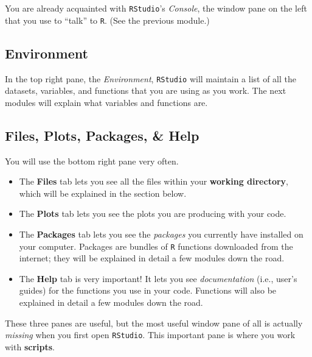 \documentclass[
]{book}
\providecommand{\tightlist}{%
  \setlength{\itemsep}{0pt}\setlength{\parskip}{0pt}}
\begin{document}
You are already acquainted with \texttt{RStudio}'s \emph{Console}, the window pane on the left that you use to ``talk'' to \texttt{R}. (See the previous module.)

\hypertarget{environment}{%
\subsection*{Environment}\label{environment}}

In the top right pane, the \emph{Environment}, \texttt{RStudio} will maintain a list of all the datasets, variables, and functions that you are using as you work. The next modules will explain what variables and functions are.

\hypertarget{files-plots-packages-help}{%
\subsection*{Files, Plots, Packages, \& Help}\label{files-plots-packages-help}}

You will use the bottom right pane very often.

\begin{itemize}
\tightlist
\item
  The \textbf{Files} tab lets you see all the files within your \textbf{working directory}, which will be explained in the section below.\\
\item
  The \textbf{Plots} tab lets you see the plots you are producing with your code.\\
\item
  The \textbf{Packages} tab lets you see the \emph{packages} you currently have installed on your computer. Packages are bundles of \texttt{R} functions downloaded from the internet; they will be explained in detail a few modules down the road.\\
\item
  The \textbf{Help} tab is very important! It lets you see \emph{documentation} (i.e., user's guides) for the functions you use in your code. Functions will also be explained in detail a few modules down the road.
\end{itemize}

These three panes are useful, but the most useful window pane of all is actually \emph{missing} when you first open \texttt{RStudio}. This important pane is where you work with \textbf{scripts}.
\end{document}
